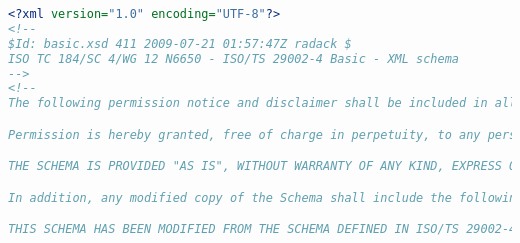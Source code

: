  \begin{lstlisting}[caption=basic.xsd, language=XML, label=lst:basic_xsd]
<?xml version="1.0" encoding="UTF-8"?>
<!--
$Id: basic.xsd 411 2009-07-21 01:57:47Z radack $
ISO TC 184/SC 4/WG 12 N6650 - ISO/TS 29002-4 Basic - XML schema
-->
<!--
The following permission notice and disclaimer shall be included in all copies of this XML schema ("the Schema"), and derivations of the Schema:

Permission is hereby granted, free of charge in perpetuity, to any person obtaining a copy of the Schema, to use, copy, modify, merge and distribute free of charge, copies of the Schema for the purposes of developing, implementing, installing and using software based on the  Schema, and to permit persons to whom the Schema is furnished to do so, subject to the following conditions:

THE SCHEMA IS PROVIDED "AS IS", WITHOUT WARRANTY OF ANY KIND, EXPRESS OR IMPLIED, INCLUDING BUT NOT LIMITED TO THE WARRANTIES OF MERCHANTABILITY, FITNESS FOR A PARTICULAR PURPOSE AND NONINFRINGEMENT. IN NO EVENT SHALL THE AUTHORS OR COPYRIGHT HOLDERS BE LIABLE FOR ANY CLAIM, DAMAGES OR OTHER LIABILITY, WHETHER IN AN ACTION OF CONTRACT, TORT OR OTHERWISE, ARISING FROM, OUT OF OR IN CONNECTION WITH THE SCHEMA OR THE USE OR OTHER DEALINGS IN THE SCHEMA.

In addition, any modified copy of the Schema shall include the following notice:

THIS SCHEMA HAS BEEN MODIFIED FROM THE SCHEMA DEFINED IN ISO/TS 29002-4, AND SHOULD NOT BE INTERPRETED AS COMPLYING WITH THAT STANDARD.


\end{lstlisting}
